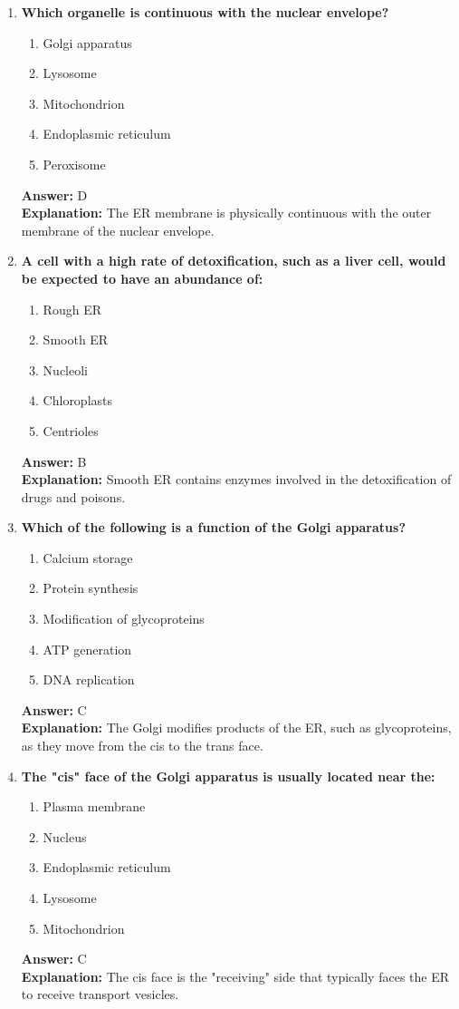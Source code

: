 \documentclass[11pt, a4paper]{article}
\begin{document}
\begin{enumerate}[leftmargin=*, label=\arabic*.]
\item \textbf{Which organelle is continuous with the nuclear envelope?}
\begin{enumerate}[label=\Alph*.]
\item Golgi apparatus
\item Lysosome
\item Mitochondrion
\item Endoplasmic reticulum
\item Peroxisome
\end{enumerate}
\textbf{Answer:} D \\
\textbf{Explanation:} The ER membrane is physically continuous with the outer membrane of the nuclear envelope.

\item \textbf{A cell with a high rate of detoxification, such as a liver cell, would be expected to have an abundance of:}
\begin{enumerate}[label=\Alph*.]
\item Rough ER
\item Smooth ER
\item Nucleoli
\item Chloroplasts
\item Centrioles
\end{enumerate}
\textbf{Answer:} B \\
\textbf{Explanation:} Smooth ER contains enzymes involved in the detoxification of drugs and poisons.

\item \textbf{Which of the following is a function of the Golgi apparatus?}
\begin{enumerate}[label=\Alph*.]
\item Calcium storage
\item Protein synthesis
\item Modification of glycoproteins
\item ATP generation
\item DNA replication
\end{enumerate}
\textbf{Answer:} C \\
\textbf{Explanation:} The Golgi modifies products of the ER, such as glycoproteins, as they move from the cis to the trans face.

\item \textbf{The "cis" face of the Golgi apparatus is usually located near the:}
\begin{enumerate}[label=\Alph*.]
\item Plasma membrane
\item Nucleus
\item Endoplasmic reticulum
\item Lysosome
\item Mitochondrion
\end{enumerate}
\textbf{Answer:} C \\
\textbf{Explanation:} The cis face is the "receiving" side that typically faces the ER to receive transport vesicles.


\end{enumerate}
\end{document}

